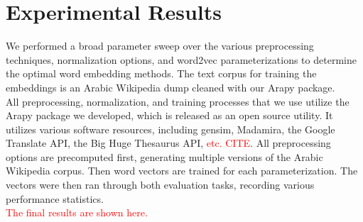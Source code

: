 
\section{Experimental Results}
\label{sec:experiments}

We performed a broad parameter sweep over the various preprocessing techniques, normalization options, and word2vec parameterizations to determine the optimal word embedding methods. The text corpus for training the embeddings is an Arabic Wikipedia dump cleaned with our Arapy package.
\\
All preprocessing, normalization, and training processes that we use utilize the Arapy package we developed, which is released as an open source utility. It utilizes various software resources, including gensim, Madamira, the Google Translate API, the Big Huge Thesaurus API, \textcolor{red}{etc. CITE}. All preprocessing options are precomputed first, generating multiple versions of the Arabic Wikipedia corpus. Then word vectors are trained for each parameterization. The vectors were then ran through both evaluation tasks, recording various performance statistics.
\\
\textcolor{red}{The final results are shown here.}

